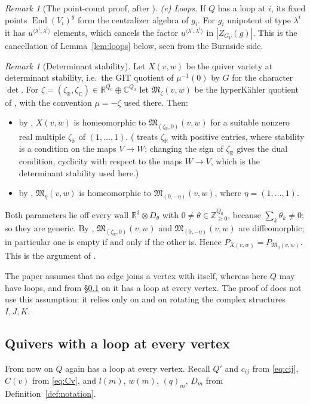 \documentclass[11pt]{amsart}
\theoremstyle{definition}
\theoremstyle{remark}
\newtheorem{remark}[theorem]{Remark}
\numberwithin{equation}{section}
\newcommand{\C}{\mathbb{C}}
\newcommand{\Z}{\mathbb{Z}}
\newcommand{\R}{\mathbb{R}}
\begin{document}
\begin{remark}[The point-count proof, after \cite{Nak04}]
\emph{(e) Loops.} If $Q$ has a loop at $i$, its fixed points $\operatorname{End}(V_i)^g$ form the
centralizer algebra of $g_i$. For $g_i$ unipotent of type $\lambda^i$ it has
$u^{\langle\lambda^i,\lambda^i\rangle}$ elements, which cancels the factor
$u^{\langle\lambda^i,\lambda^i\rangle}$ in $|Z_{G_V}(g)|$. This is the cancellation of
Lemma~\ref{lem:loops} below, seen from the Burnside side.
\end{remark}

\begin{remark}[Determinant stability]\label{rem:det}
Let $X(v,w)$ be the quiver variety at determinant stability, i.e.\ the GIT quotient of $\mu^{-1}(0)$ by
$G$ for the character $\det$. For $\zeta=(\zeta_\R,\zeta_\C)\in\R^{Q_0}\oplus\C^{Q_0}$ let
$\mathfrak M_\zeta(v,w)$ be the hyperK\"ahler quotient of \cite[\S2]{Nak}, with the convention
$\mu=-\zeta$ used there. Then:
\begin{itemize}[leftmargin=2em]
\item by \cite[Theorem~3.2 and Proposition~3.5]{Nak}, $X(v,w)$ is homeomorphic to
$\mathfrak M_{(\zeta_\R,0)}(v,w)$ for a suitable nonzero real multiple $\zeta_\R$ of $(1,\dots,1)$.
(\cite[Proposition~3.5]{Nak} treats $\zeta_\R$ with positive entries, where stability is a condition on
the maps $V\to W$; changing the sign of $\zeta_\R$ gives the dual condition, cyclicity with respect to
the maps $W\to V$, which is the determinant stability used here.)
\item by \cite[Theorem~3.1]{Nak}, $\mathfrak M_\eta(v,w)$ is homeomorphic to
$\mathfrak M_{(0,-\eta)}(v,w)$, where $\eta=(1,\dots,1)$.
\end{itemize}
Both parameters lie off every wall $\R^3\otimes D_\theta$ with $0\neq\theta\in\Z_{\ge0}^{Q_0}$, because
$\sum_k\theta_k\neq0$; so they are generic. By \cite[Corollary~4.2]{Nak},
$\mathfrak M_{(\zeta_\R,0)}(v,w)$ and $\mathfrak M_{(0,-\eta)}(v,w)$ are diffeomorphic; in particular one
is empty if and only if the other is. Hence $P_{X(v,w)}=P_{\mathfrak M_\eta(v,w)}$. This is the argument of
\cite[proof of Proposition~6.4]{Hik}.

The paper \cite{Nak} assumes that no edge joins a vertex with itself, whereas here $Q$ may have loops,
and from \S\ref{subsec:loops} on it has a loop at every vertex. The proof of \cite[Corollary~4.2]{Nak} does not use this assumption: it relies only on
\cite[Theorem~4.1(1),(2)]{Nak} and on rotating the complex structures $I,J,K$.
\end{remark}

\subsection{Quivers with a loop at every vertex}\label{subsec:loops}
From now on $Q$ again has a loop at every vertex. Recall $Q'$ and $c_{ij}$ from \eqref{eq:cij}, $C(v)$
from \eqref{eq:Cv}, and $l(m)$, $w(m)$, $(q)_m$, $D_m$ from Definition~\ref{def:notation}.
\end{document}
